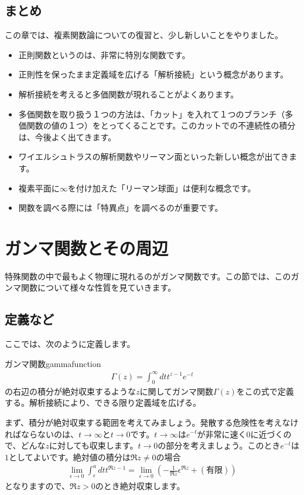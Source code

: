 \documentclass[report,paper=a4, fontsize=12pt, line_length=16cm, number_of_lines=33,dvipdfmx]{jlreq}
\numberwithin{equation}{section}
\begin{document}
\section{まとめ}
この章では、複素関数論についての復習と、少し新しいことをやりました。
\begin{itemize}
  \item 正則関数というのは、非常に特別な関数です。
  \item 正則性を保ったまま定義域を広げる「解析接続」という概念があります。
  \item 解析接続を考えると多価関数が現れることがよくあります。
  \item 多価関数を取り扱う１つの方法は、「カット」を入れて１つのブランチ（多価関数の値の１つ）をとってくることです。このカットでの不連続性の積分は、今後よく出てきます。
  \item ワイエルシュトラスの解析関数やリーマン面といった新しい概念が出てきます。
  \item 複素平面に$\infty$を付け加えた「リーマン球面」は便利な概念です。
  \item 関数を調べる際には「特異点」を調べるのが重要です。
\end{itemize}


\chapter{ガンマ関数とその周辺}
特殊関数の中で最もよく物理に現れるのがガンマ関数です。この節では、このガンマ関数について様々な性質を見ていきます。
\section{定義など}
ここでは、次のように定義します。
\begin{definition}{ガンマ関数}{gammafunction}
\begin{align}
  \Gamma(z)=\int_0^{\infty}dt t^{z-1}e^{-t}\label{eulerintegral}
\end{align}
の右辺の積分が絶対収束するような$z$に関してガンマ関数$\Gamma(z)$をこの式で定義する。解析接続により、できる限り定義域を広げる。
\end{definition}

まず、積分が絶対収束する範囲を考えてみましょう。発散する危険性を考えなければならないのは、$t\to\infty$と$t\to 0$です。$t\to\infty$は$e^{-t}$が非常に速く$0$に近づくので、どんな$z$に対しても収束します。$t\to 0$の部分を考えましょう。このとき$e^{-t}$は$1$としてよいです。絶対値の積分は$\Re z\ne 0$の場合
\begin{align}
  \lim_{\epsilon\to 0}\int_{\epsilon}^{a}dt t^{\Re z-1}=\lim_{\epsilon\to 0}(-\frac{1}{\Re z}\epsilon^{\Re z}+(\text{有限}) )
\end{align}
となりますので、$\Re z>0$のとき絶対収束します。
\end{document}
